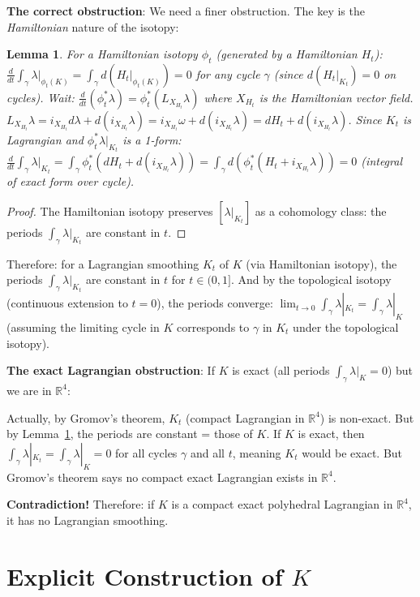 \documentclass[12pt]{article}
\newtheorem{lemma}{Lemma}
\theoremstyle{definition}
\begin{document}
\textbf{The correct obstruction}: We need a finer obstruction. The key is the \emph{Hamiltonian} nature of the isotopy:

\begin{lemma}\label{lem:hamiltonian-action}
For a Hamiltonian isotopy $\phi_t$ (generated by a Hamiltonian $H_t$): $\frac{d}{dt}\int_\gamma\lambda|_{\phi_t(K)} = \int_\gamma d(H_t|_{\phi_t(K)}) = 0$ for any cycle $\gamma$ (since $d(H_t|_{K_t}) = 0$ on cycles). Wait: $\frac{d}{dt}(\phi_t^*\lambda) = \phi_t^*(L_{X_{H_t}}\lambda)$ where $X_{H_t}$ is the Hamiltonian vector field. $L_{X_{H_t}}\lambda = i_{X_{H_t}}d\lambda + d(i_{X_{H_t}}\lambda) = i_{X_{H_t}}\omega + d(i_{X_{H_t}}\lambda) = dH_t + d(i_{X_{H_t}}\lambda)$. Since $K_t$ is Lagrangian and $\phi_t^*\lambda|_{K_t}$ is a 1-form: $\frac{d}{dt}\int_\gamma\lambda|_{K_t} = \int_\gamma\phi_t^*(dH_t + d(i_{X_{H_t}}\lambda)) = \int_\gamma d(\phi_t^*(H_t + i_{X_{H_t}}\lambda)) = 0$ (integral of exact form over cycle).
\end{lemma}

\begin{proof}
The Hamiltonian isotopy preserves $[\lambda|_{K_t}]$ as a cohomology class: the periods $\int_\gamma\lambda|_{K_t}$ are constant in $t$.
\end{proof}

Therefore: for a Lagrangian smoothing $K_t$ of $K$ (via Hamiltonian isotopy), the periods $\int_\gamma\lambda|_{K_t}$ are constant in $t$ for $t\in(0,1]$. And by the topological isotopy (continuous extension to $t=0$), the periods converge: $\lim_{t\to 0}\int_\gamma\lambda|_{K_t} = \int_\gamma\lambda|_K$ (assuming the limiting cycle in $K$ corresponds to $\gamma$ in $K_t$ under the topological isotopy).

\textbf{The exact Lagrangian obstruction}: If $K$ is exact (all periods $\int_\gamma\lambda|_K = 0$) but we are in $\mathbb{R}^4$:

Actually, by Gromov's theorem, $K_t$ (compact Lagrangian in $\mathbb{R}^4$) is non-exact. But by Lemma~\ref{lem:hamiltonian-action}, the periods are constant = those of $K$. If $K$ is exact, then $\int_\gamma\lambda|_{K_t} = \int_\gamma\lambda|_K = 0$ for all cycles $\gamma$ and all $t$, meaning $K_t$ would be exact. But Gromov's theorem says no compact exact Lagrangian exists in $\mathbb{R}^4$.

\textbf{Contradiction!} Therefore: if $K$ is a compact exact polyhedral Lagrangian in $\mathbb{R}^4$, it has no Lagrangian smoothing.

\section{Explicit Construction of $K$}
\end{document}
